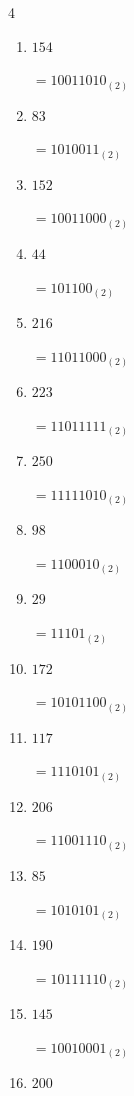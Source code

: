 \begin{multicols}{4}
\begin{enumerate}
        $=11000_{(2)}$

  \item $154$

        $=10011010_{(2)}$

  \item $83$

        $=1010011_{(2)}$

  \item $152$

        $=10011000_{(2)}$

  \item $44$

        $=101100_{(2)}$

  \item $216$

        $=11011000_{(2)}$

  \item $223$

        $=11011111_{(2)}$

  \item $250$

        $=11111010_{(2)}$

  \item $98$

        $=1100010_{(2)}$

  \item $29$

        $=11101_{(2)}$

  \item $172$

        $=10101100_{(2)}$

  \item $117$

        $=1110101_{(2)}$

  \item $206$

        $=11001110_{(2)}$

  \item $85$

        $=1010101_{(2)}$

  \item $190$

        $=10111110_{(2)}$

\columnbreak %

  \item $145$

        $=10010001_{(2)}$

  \item $200$


\end{enumerate}
\end{multicols}
